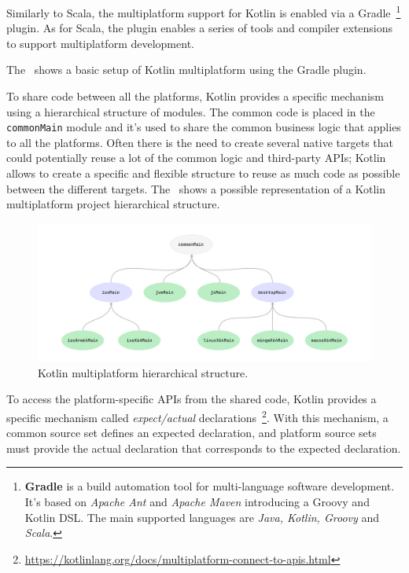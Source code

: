 Similarly to Scala, the multiplatform support for Kotlin is enabled via a
Gradle~\footnote{\textbf{Gradle} is a build automation tool for multi-language software development. It's based on \emph{Apache Ant} and
	\emph{Apache Maven} introducing a Groovy and Kotlin DSL. The main supported languages are \emph{Java, Kotlin, Groovy} and \emph{Scala}.} plugin.
As for Scala, the plugin enables a series of tools and compiler extensions to support multiplatform development.



The~ shows a basic setup of Kotlin multiplatform using the Gradle plugin.

To share code between all the platforms, Kotlin provides a specific mechanism using a hierarchical structure of modules.
The common code is placed in the \texttt{commonMain} module and it's used to share the common business logic that applies to all the platforms.
Often there is the need to create several native targets that could potentially reuse a lot of the common logic and third-party APIs; Kotlin allows
to create a specific and flexible structure to reuse as much code as possible between the different targets.
The~ shows a possible representation of a Kotlin multiplatform project hierarchical structure.

\begin{figure}
	\centering
	\includegraphics[width=\linewidth]{figures/kotlin-multiplatform-hierarchical-structure.pdf}
	\caption{Kotlin multiplatform hierarchical structure.}
	\label{fig:kotlin-multiplatform-hierarchy}
\end{figure}

To access the platform-specific APIs from the shared code, Kotlin provides a specific mechanism called \emph{expect/actual}
declarations~\footnote{\url{https://kotlinlang.org/docs/multiplatform-connect-to-apis.html}}.
With this mechanism, a common source set defines an expected declaration, and platform source sets must provide the actual declaration that
corresponds to the expected declaration.

